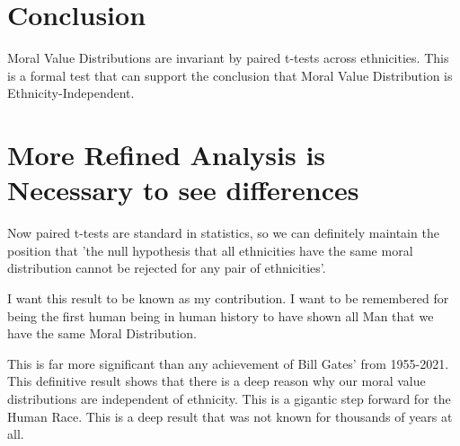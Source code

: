 \documentclass{amsart}
\begin{document}
\section{Conclusion}

Moral Value Distributions are invariant by paired t-tests across ethnicities.  This is a formal test that can support the conclusion that Moral Value Distribution is Ethnicity-Independent.

\section{More Refined Analysis is Necessary to see differences}

Now paired t-tests are standard in statistics, so we can definitely maintain the position that 'the null hypothesis that all ethnicities have the same moral distribution cannot be rejected for any pair of ethnicities'.

I want this result to be known as my contribution.  I want to be remembered for being the first human being in human history to have shown all Man that we have the same Moral Distribution.

This is far more significant than any achievement of Bill Gates' from 1955-2021.
This definitive result shows that there is a deep reason why our moral value distributions are independent of ethnicity.  This is a gigantic step forward for the Human Race.  This is a deep result that was not known for thousands of years at all.
\end{document}
